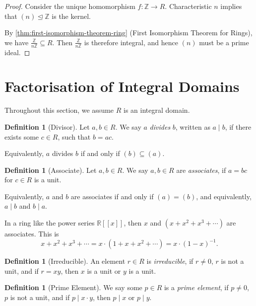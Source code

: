 \documentclass{article}
\theoremstyle{definition}
\newtheorem{definition}[theorem]{Definition}
\theoremstyle{remark}
\newcommand{\pqty}[1]{\left(#1\right)}
\newcommand{\bbrac}[1]{[\![#1]\!]}
\newcommand{\flatfrac}[2]{\frac{#1}{#2}}
\newcommand{\functiondomain}[3]{#1:#2\to #3}
\newcommand{\inverse}{^{-1}}
\newcommand{\subring}{\subseteq}
\newcommand{\idealsub}{\trianglelefteq}
\newcommand{\divides}{\mid}
\newcommand{\ZZ}{\mathbb{Z}}
\newcommand{\RR}{\mathbb{R}}
\begin{document}
\begin{proof}
    Consider the unique homomorphism \(\functiondomain{f}{{\ZZ}}{R}\). Characteristic \(n\) implies that \(\pqty{n} \idealsub \ZZ\) is the kernel.

    By \autoref{thm:first-isomorphism-theorem-ring} (First Isomorphism Theorem for Rings), we have \(\flatfrac{\ZZ}{n\ZZ} \subring R\). Then \(\flatfrac{\ZZ}{n\ZZ}\) is therefore integral, and hence \(\pqty{n}\) must be a prime ideal.
\end{proof}

\section{Factorisation of Integral Domains}

Throughout this section, we assume \(R\) is an integral domain.

\begin{definition}[Divisor]
    \label{def:divisor}%
    Let \(a, b \in R\). We say \(a\) \emph{divides} \(b\), written as \(a \divides b\), if there exists some \(c \in R\), such that \(b = ac\).

    Equivalently, \(a\) divides \(b\) if and only if \(\pqty{b} \subseteq \pqty{a}\).
\end{definition}

\begin{definition}[Associate]
    \label{def:associate}%
    Let \(a, b \in R\). We say \(a, b \in R\) are \emph{associates}, if \(a = bc\) for \(c \in R\) is a unit.

    Equivalently, \(a\) and \(b\) are associates if and only if \(\pqty{a} = \pqty{b}\), and equivalently, \(a \divides b\) and \(b \divides a\).
\end{definition}

In a ring like the power series \(\RR\bbrac{x}\), then \(x\) and \(\pqty{x + x^2 + x^3 + \cdots}\) are associates. This is
\[
    x + x^2 + x^3 + \cdots = x \cdot \pqty{1 + x + x^2 + \cdots} = x \cdot \pqty{1 - x}\inverse.
\]

\begin{definition}[Irreducible]
    \label{def:irreducible}%
    An element \(r \in R\) is \emph{irreducible}, if \(r \neq 0\), \(r\) is not a unit, and if \(r = xy\), then \(x\) is a unit or \(y\) is a unit.
\end{definition}

\begin{definition}[Prime Element]
    \label{def:prime-element}%
    We say some \(p \in R\) is a \emph{prime element}, if \(p \neq 0\), \(p\) is not a unit, and if \(p \divides x \cdot y\), then \(p \divides x\) or \(p \divides y\).
\end{definition}
\end{document}
